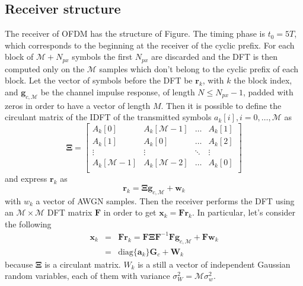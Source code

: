 \documentclass[10pt]{article}
\newcommand{\ofdM} {\mathcal{M}}
\newcommand{\DFTmat} {\mathcal{\boldsymbol{F}}}
\begin{document}
\subsection*{Receiver structure}
The receiver of OFDM has the structure of Figure. The timing phase is $t_0 = 5 T$, which corresponds to the beginning at the receiver of the cyclic prefix. For each block of $\ofdM + N_{px}$ symbols the first $N_{px}$ are discarded and the DFT is then computed only on the $\ofdM$ samples which don't belong to the cyclic prefix of each block. Let the vector of symbols before the DFT be $\mathbf{r}_k$, with $k$ the block index, and $\mathbf{g}_{c,\ofdM}$ be the channel impulse response, of length $N \le N_{px} - 1$, padded with zeros in order to have a vector of length $M$. Then it is possible to define the circulant matrix of the IDFT of the transmitted symbols $a_k[i], i = 0, \dots, \ofdM$ as
\begin{equation}
	\boldsymbol{\Xi} = 
	\begin{bmatrix}
		A_k[0] & A_k[\ofdM - 1] & \dots & A_k[1] \\
		A_k[1] & A_k[0] & \dots & A_k[2] \\
		\vdots & \vdots & \ddots & \vdots \\
		A_k[\ofdM - 1] & A_k[\ofdM - 2] & \dots & A_k[0] \\
	\end{bmatrix}
\end{equation}
and express $\mathbf{r}_k$ as
\begin{equation}
	\mathbf{r}_k = \boldsymbol{\Xi} \mathbf{g}_{c,\ofdM} + \mathbf{w}_k
\end{equation}
with $w_k$ a vector of AWGN samples. Then the receiver performs the DFT using an $\ofdM \times \ofdM$ DFT matrix $\DFTmat$ in order to get $ \mathbf{x}_k = \DFTmat \mathbf{r}_k$. In particular, let's consider the following 
\begin{eqnarray}
	 \mathbf{x}_k & = & \DFTmat \mathbf{r}_k = \DFTmat \boldsymbol{\Xi} \DFTmat^{-1} \DFTmat \mathbf{g}_{c,\ofdM} + \DFTmat \mathbf{w}_k\\
	  & = & \mathrm{diag}\{\mathbf{a}_k\} \mathbf{G}_c + \mathbf{W}_k
\end{eqnarray}
because $\boldsymbol{\Xi}$ is a circulant matrix. $W_k$ is a still a vector of independent Gaussian random variables, each of them with variance $\sigma_W^2 = \ofdM \sigma_w^2$. 
\end{document}
